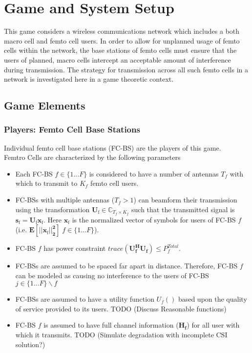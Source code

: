 \documentclass[12pt]{article}
\begin{document}
\section{Game and System Setup}

This game considers a wireless communications network which includes a both macro cell and femto cell users. In order to allow for unplanned usage of femto cells within the network, the base stations of femto cells must ensure that the users of planned, macro cells intercept an acceptable amount of interference during transmission. The strategy for transmission across all such femto cells in a network is investigated here in a game theoretic context. 

\subsection{Game Elements}
\subsubsection{Players: Femto Cell Base Stations}


Individual femto cell base stations (FC-BS) are the players of this game.
\\
Femtro Cells are characterized by the following parameters
\begin{itemize}
\item Each FC-BS  $f \in \{1 ... F\}$ is considered to have a number of antennas $T_f$ with which to transmit to $K_f$ femto cell users.
\\
\item FC-BSs with multiple antennas ($T_f >1$) can beamform their transmission using the transformation $\mathbf{U_{\mathrm{f}}} \in \mathbb{C}_{T_f \times K_f}$ such that the transmitted signal is $\mathbf{s_{\mathrm{f}
}}= \mathbf{U_{\mathrm{f}}}\mathbf{x_{\mathrm{f}}}$. Here $\mathbf{x_{\mathrm{f}}}$ is the normalized vector of symbols for users of FC-BS $f$ (i.e. $\mathbf{E[||\mathbf{x_{\mathrm{f}}}||_2^2]} \; f \in \{1 ... F\}$).
\\
\item 
FC-BS $f$ has power constraint $trace(\mathbf{U_f^H}\mathbf{U_f}) \leq P^{Total}_{f} $.
\\
\item FC-BSs are assumed to be spaced far apart in distance. Therefore, FC-BS $f$ can be modeled as causing no interference to the users of FC-BS $j \in \{1 ... F\}\backslash f$
\item 
 FC-BSs are assumed to have a utility function $U_f()$ based upon the quality of service provided to its users. TODO (Discuss Reasonable functions)
\\
\item FC-BS $f$ is assumed to have full channel information ($\mathbf{H_f}$) for all user  with which it transmits. TODO (Simulate degradation with incomplete CSI solution?)
\\
\end{itemize}
\end{document}
